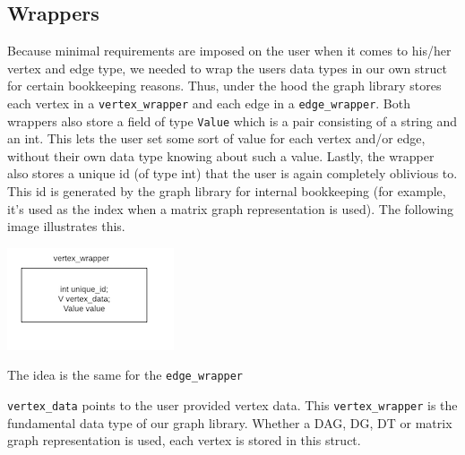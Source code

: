 \documentclass[12pt]{article}
\begin{document}
\subsection{Wrappers}
Because minimal requirements are imposed on the user when it comes to his/her vertex and edge type, we needed to wrap the users data types in our own struct for certain bookkeeping reasons. Thus, under the hood the graph library stores each vertex in a \texttt{vertex\_wrapper} and each edge in a \texttt{edge\_wrapper}. Both wrappers also store a field of type \texttt{Value} which is a pair consisting of a string and an int. This lets the user set some sort of value for each vertex and/or edge, without their own data type knowing about such a value. Lastly, the wrapper also stores a unique id (of type int) that the user is again completely oblivious to. This id is generated by the graph library for internal bookkeeping (for example, it's used as the index when a matrix graph representation is used). The following image illustrates this.

\includegraphics{vertexwrapper}

The idea is the same for the \texttt{edge\_wrapper}

\texttt{vertex\_data} points to the user provided vertex data. This \texttt{vertex\_wrapper} is the fundamental data type of our graph library. Whether a DAG, DG, DT or matrix graph representation is used, each vertex is stored in this struct. 
\end{document}
